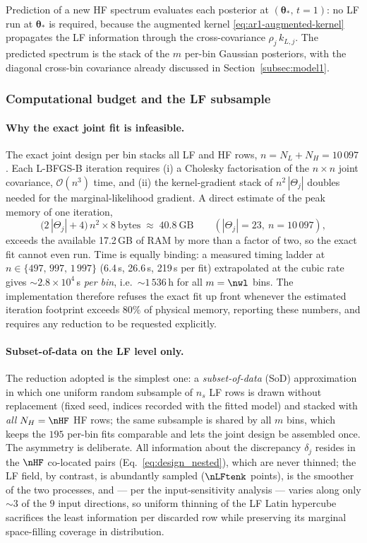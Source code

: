 Prediction of a new HF spectrum evaluates each posterior at
$(\boldsymbol\theta_\ast,\,t=1)$: no LF run at $\boldsymbol\theta_\ast$ is
required, because the augmented kernel \eqref{eq:ar1-augmented-kernel}
propagates the LF information through the cross-covariance
$\rho_j\,k_{L,j}$. The predicted spectrum is the stack of the $m$ per-bin
Gaussian posteriors, with the diagonal cross-bin covariance already discussed
in Section~\ref{subsec:model1}.

\subsubsection{Computational budget and the LF subsample}
\label{subsubsec:model1-subsampling}

\paragraph{Why the exact joint fit is infeasible.}
The exact joint design per bin stacks all LF and HF rows,
$n = N_L + N_H = 10\,097$. Each L-BFGS-B iteration requires (i) a Cholesky
factorisation of the $n\times n$ joint covariance, $\mathcal O(n^3)$ time, and
(ii) the kernel-gradient stack of $n^2\,|\Theta_j|$ doubles needed for the
marginal-likelihood gradient. A direct estimate of the peak memory of one
iteration,
\[
    \bigl(2\,|\Theta_j| + 4\bigr)\, n^2 \times 8 \ \text{bytes}
    \;\approx\; 40.8\ \text{GB}
    \qquad (|\Theta_j|=23,\ n=10\,097),
\]
exceeds the available 17.2\,GB of RAM by more than a factor of two, so the
exact fit cannot even run. Time is equally binding: a measured timing ladder
at $n\in\{497,\,997,\,1\,997\}$ (6.4\,s, 26.6\,s, 219\,s per fit) extrapolated
at the cubic rate gives ${\sim}2.8\times10^{4}$\,s \emph{per bin}, i.e.\
${\sim}1\,536$\,h for all $m=\nwl$ bins. The implementation therefore refuses
the exact fit up front whenever the estimated iteration footprint exceeds
$80\%$ of physical memory, reporting these numbers, and requires any reduction
to be requested explicitly.

\paragraph{Subset-of-data on the LF level only.}
The reduction adopted is the simplest one: a \emph{subset-of-data} (SoD)
approximation in which one uniform random subsample of $n_s$ LF rows is drawn
without replacement (fixed seed, indices recorded with the fitted model) and
stacked with \emph{all} $N_H=\nHF$ HF rows; the same subsample is shared by
all $m$ bins, which keeps the $195$ per-bin fits comparable and lets the joint
design be assembled once. The asymmetry is deliberate. All information about
the discrepancy $\delta_j$ resides in the $\nHF$ co-located pairs
(Eq.~\ref{eq:design_nested}), which are never thinned; the LF field, by
contrast, is abundantly sampled ($\nLFtenk$ points), is the smoother of the
two processes, and --- per the input-sensitivity analysis --- varies along
only ${\sim}3$ of the $9$ input directions, so uniform thinning of the LF
Latin hypercube sacrifices the least information per discarded row while
preserving its marginal space-filling coverage in distribution.

